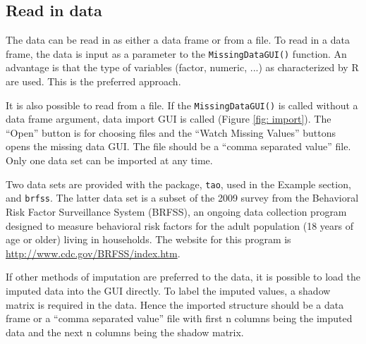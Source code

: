 \documentclass[english]{article}
\begin{document}
\subsection{Read in data}

The data can be read in as either a data frame or from a file. To read in a data frame, the data is input as a parameter to the \texttt{MissingDataGUI()} function.  An advantage is that the type of variables (factor, numeric, ...) as characterized by R are used. This is the preferred approach.

It is also possible to read from a file.  If the \texttt{MissingDataGUI()} is called without a data frame argument, data import GUI is called (Figure \ref{fig: import}).  The ``Open'' button is for choosing files and the ``Watch Missing Values'' buttons opens the missing data GUI. The file should be a ``comma separated value'' file. Only one data set can be imported at any time.

Two data sets are provided with the package, \texttt{tao}, used in the Example section, and \texttt{brfss}. The latter data set is a subset of the 2009 survey from the Behavioral Risk Factor Surveillance System (BRFSS), an ongoing data collection program designed to measure behavioral risk factors for the adult population (18 years of age or older) living in households. The website for this program is \url{http://www.cdc.gov/BRFSS/index.htm}.

If other methods of imputation are preferred to the data, it is possible to load the imputed data into the GUI directly. To label the imputed values, a shadow matrix is required in the data. Hence the imported structure should be a data frame or a ``comma separated value'' file with first n columns being the imputed data and the next n columns being the shadow matrix.
\end{document}
